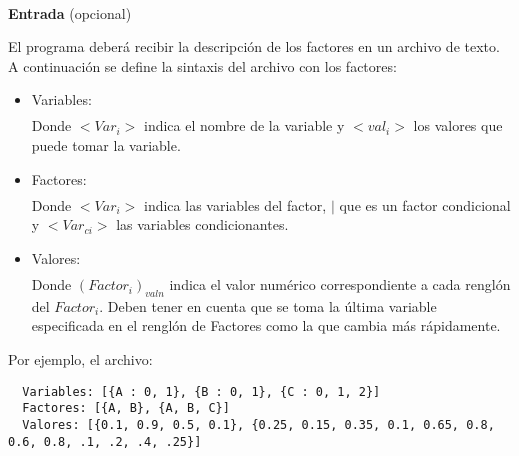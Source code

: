 \textbf{\\Entrada} (opcional)\bigskip

\noindent El programa deberá recibir la descripción de los factores en un archivo de texto. A continuación se define la sintaxis del archivo con los factores:

\begin{itemize}
  \item Variables: 
    \begin{align*}
      [&\{<Var_1>:<val_0>, . . . , <val_m>\},\\
      &\{<Var_2>:<val_0>, . . . , <val_m>\}, . . . ,\\
      &\{<Var_n>:<val_0>, . . . , <val_m>\}]
    \end{align*}
    Donde \(<Var_{i}>\) indica el nombre de la variable y \(<val_i>\) los valores que puede tomar la variable.
  \item Factores: 
    \begin{align*}
      [&\{<Var_1>,<Var_2>, . . . , <Var_n> | <Var_{c1}>,<Var_{c2}>, . . ., <Var_{cn}>\},\\
      & . . . , \\
      &\{<Var_1>,<Var_2>, . . . , <Var_n>\}]
    \end{align*}
    Donde \(<Var_{i}>\) indica las variables del factor, \(\mid\) que es un factor condicional y \(<Var_{ci}>\) las variables condicionantes.
  \item Valores: 
    \begin{align*}
      [&\{(Factor_1)_{val1}, (Factor_1)_{val2}, . . . , (Factor_1)_{valk}\},\\
      &\{(Factor_2)_{val1}, (Factor_2)_{val2}, . . . , (Factor_2)_{valk}\},\\
      & . . . \\
      &\{(Factor_j)_{val1}, (Factor_j)_{val2}, . . . , (Factor_j)_{valk}\}]
    \end{align*}
    Donde \((Factor_i)_{valn}\) indica el valor numérico correspondiente a cada renglón del \(Factor_i\). Deben tener en cuenta que se toma la última variable especificada en el renglón de Factores como la que cambia más rápidamente.
\end{itemize}


\noindent Por ejemplo, el archivo:

\begin{verbatim}
  Variables: [{A : 0, 1}, {B : 0, 1}, {C : 0, 1, 2}]
  Factores: [{A, B}, {A, B, C}]
  Valores: [{0.1, 0.9, 0.5, 0.1}, {0.25, 0.15, 0.35, 0.1, 0.65, 0.8, 0.6, 0.8, .1, .2, .4, .25}]
\end{verbatim}

